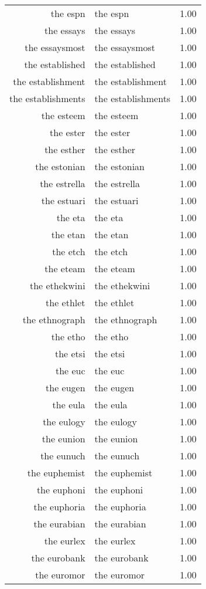 \begin{table}[ht]
\begin{tabular}{rlr}
  the espn & the espn & 1.00 \\ 
  the essays & the essays & 1.00 \\ 
  the essaysmost & the essaysmost & 1.00 \\ 
  the established & the established & 1.00 \\ 
  the establishment & the establishment & 1.00 \\ 
  the establishments & the establishments & 1.00 \\ 
  the esteem & the esteem & 1.00 \\ 
  the ester & the ester & 1.00 \\ 
  the esther & the esther & 1.00 \\ 
  the estonian & the estonian & 1.00 \\ 
  the estrella & the estrella & 1.00 \\ 
  the estuari & the estuari & 1.00 \\ 
  the eta & the eta & 1.00 \\ 
  the etan & the etan & 1.00 \\ 
  the etch & the etch & 1.00 \\ 
  the eteam & the eteam & 1.00 \\ 
  the ethekwini & the ethekwini & 1.00 \\ 
  the ethlet & the ethlet & 1.00 \\ 
  the ethnograph & the ethnograph & 1.00 \\ 
  the etho & the etho & 1.00 \\ 
  the etsi & the etsi & 1.00 \\ 
  the euc & the euc & 1.00 \\ 
  the eugen & the eugen & 1.00 \\ 
  the eula & the eula & 1.00 \\ 
  the eulogy & the eulogy & 1.00 \\ 
  the eunion & the eunion & 1.00 \\ 
  the eunuch & the eunuch & 1.00 \\ 
  the euphemist & the euphemist & 1.00 \\ 
  the euphoni & the euphoni & 1.00 \\ 
  the euphoria & the euphoria & 1.00 \\ 
  the eurabian & the eurabian & 1.00 \\ 
  the eurlex & the eurlex & 1.00 \\ 
  the eurobank & the eurobank & 1.00 \\ 
  the euromor & the euromor & 1.00 \\ 

\end{tabular}
\end{table}
